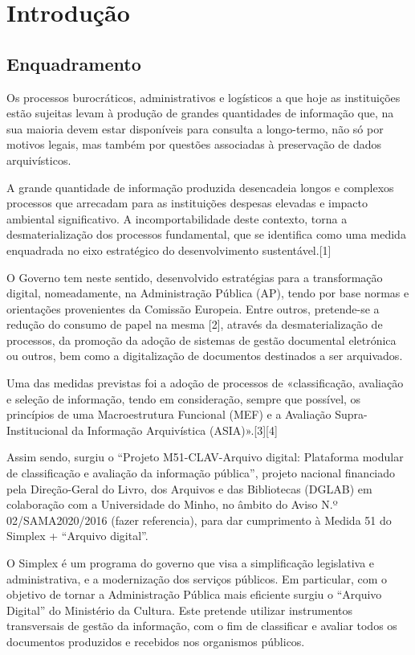 \chapter{Introdução}

\section{Enquadramento}

Os processos burocráticos, administrativos e logísticos a que hoje as instituições estão sujeitas levam à produção de grandes quantidades de informação que, na sua maioria devem estar disponíveis para consulta a longo-termo, não só por motivos legais, mas também por questões associadas à preservação de dados arquivísticos. 

A grande quantidade de informação produzida desencadeia longos e complexos processos que arrecadam para as instituições despesas elevadas e impacto ambiental significativo. A incomportabilidade deste contexto, torna a desmaterialização dos processos fundamental, que se identifica como uma medida enquadrada no eixo estratégico do desenvolvimento sustentável.[1]

O Governo tem neste sentido, desenvolvido estratégias para a transformação digital, nomeadamente, na Administração Pública (AP), tendo por base normas e orientações provenientes da Comissão Europeia. Entre outros, pretende-se a redução do consumo de papel na mesma [2], através da desmaterialização de processos, da promoção da adoção de sistemas de gestão documental eletrónica ou outros, bem como a digitalização de documentos destinados a ser arquivados. 

Uma das medidas previstas foi a adoção de processos de «classificação, avaliação e seleção de informação, tendo em consideração, sempre que possível, os princípios de uma Macroestrutura Funcional (MEF) e a Avaliação Supra-Institucional da Informação Arquivística (ASIA)».[3][4]

Assim sendo, surgiu o “Projeto M51-CLAV-Arquivo digital: Plataforma modular de classificação e avaliação da informação pública”, projeto nacional financiado pela Direção-Geral do Livro, dos Arquivos e das Bibliotecas (DGLAB) em colaboração com a Universidade do Minho, no âmbito do Aviso N.º 02/SAMA2020/2016 (fazer referencia), para dar cumprimento à Medida 51 do Simplex + “Arquivo digital”. 

O Simplex é um programa do governo que visa a simplificação legislativa e administrativa, e a modernização dos serviços públicos. Em particular, com o objetivo de tornar a Administração Pública mais eficiente surgiu o “Arquivo Digital” do Ministério da Cultura. Este pretende utilizar instrumentos transversais de gestão da informação, com o fim de classificar e avaliar todos os documentos produzidos e recebidos nos organismos públicos. 


